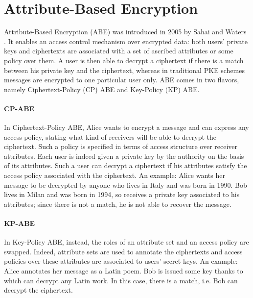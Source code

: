\section{Attribute-Based Encryption}

Attribute-Based Encryption (ABE) was introduced in 2005 by Sahai and Waters \cite{Sahai}.
It enables an access control mechanism over encrypted data: both users’ private keys and ciphertexts are associated with a set of ascribed attributes or some policy over them.
A user is then able to decrypt a ciphertext if there is a match between his private key and the ciphertext, whereas in traditional PKE schemes messages are encrypted to one particular user only.
\newline\newline
ABE comes in two flavors, namely Ciphertext-Policy (CP) ABE and Key-Policy (KP) ABE.

\paragraph*{CP-ABE}
In Ciphertext-Policy ABE, Alice wants to encrypt a message and can express any access policy, stating what kind of receivers will be able to decrypt the ciphertext.
Such a policy is specified in terms of access structure over receiver attributes.
Each user is indeed given a private key by the authority on the basis of its attributes.
Such a user can decrypt a ciphertext if his attributes satisfy the access policy associated with the ciphertext.
An example:  Alice wants her message to be decrypted by anyone who lives in Italy and was born in 1990.
Bob lives in Milan and was born in 1994, so receives a private key associated to his attributes; since there is not a match, he is not able to recover the message.

\paragraph*{KP-ABE}
In Key-Policy ABE, instead, the roles of an attribute set and an access policy are swapped.
Indeed, attribute sets are used to annotate the ciphertexts and access policies over these attributes are associated to users’ secret keys.
An example:  Alice annotates her message as a Latin poem. Bob is issued some key thanks to which can decrypt any Latin work.
In this case, there is a match, i.e. Bob can decrypt the ciphertext.
